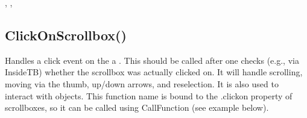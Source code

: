 \documentclass[letterpaper,10pt,english]{sphinxmanual}
\begin{document}
\sphinxAtStartPar
{}

\sphinxAtStartPar
{}, , 

\ignorespaces 

\subsection{ClickOnScrollbox()}
\label{\detokenize{reference/ui:clickonscrollbox}}\label{\detokenize{reference/ui:index-3}}
\sphinxAtStartPar
{}

\sphinxAtStartPar
{}

\sphinxAtStartPar
Handles a click event on the a  . This should be called after one checks (e.g., via InsideTB) whether the scrollbox was actually clicked on.  It will handle scrolling, moving via the thumb, up/down arrows, and reselection. It is also used to interact with   objects. This function name is bound to the .clickon property of scrollboxes, so it can be called using CallFunction (see example below).

\sphinxAtStartPar
{}

\begin{sphinxVerbatim}[commandchars=\\\{\}]
\end{sphinxVerbatim}

\sphinxAtStartPar
{}
\end{document}
